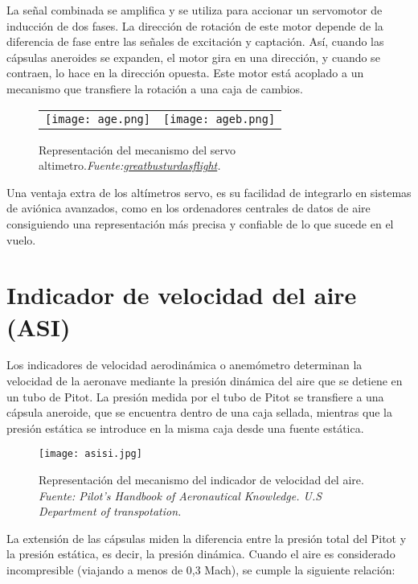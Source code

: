 La señal combinada se amplifica y se utiliza para accionar un servomotor de inducción de dos fases. La dirección de rotación de este motor depende de la diferencia de fase entre las señales de excitación y captación. Así, cuando las cápsulas aneroides se expanden, el motor gira en una dirección, y cuando se contraen, lo hace en la dirección opuesta. Este motor está acoplado a un mecanismo que transfiere la rotación a una caja de cambios.
\begin{figure}[H]
	\centering
	\begin{tabular}{c c}  
		\texttt{[image: age.png]} & 
		\texttt{[image: ageb.png]}\\
	\end{tabular}
	
    \caption{\centering Representación del mecanismo del servo altimetro.\textit{Fuente:\href{https://greatbustardsflight.blogspot.com/2015/01/el-altimetro-convencional-y-el-ciclo-de.html}{greatbusturdasflight}.}}
\label{fig:yepa}
\end{figure}

Una ventaja extra de los altímetros servo, es su facilidad de integrarlo en sistemas de aviónica avanzados, como en los ordenadores centrales de datos de aire consiguiendo una representación más precisa y confiable de lo que sucede en el vuelo.

\section{Indicador de velocidad del aire (ASI)}

Los indicadores de velocidad aerodinámica o anemómetro determinan la velocidad de la aeronave mediante la presión dinámica del aire que se detiene en un tubo de Pitot. La presión medida por el tubo de Pitot se transfiere a una cápsula aneroide, que se encuentra dentro de una caja sellada, mientras que la presión estática se introduce en la misma caja desde una fuente estática.
\begin{figure}[H] 
    \centering
    \texttt{[image: asisi.jpg]}
    \caption{\centering Representación del mecanismo del indicador de velocidad del aire. \textit{Fuente: Pilot's Handbook of Aeronautical Knowledge. U.S Department of transpotation.}}
    \label{fig:placeholder12}
\end{figure}

La extensión de las cápsulas miden la diferencia entre la presión total del Pitot y la presión estática, es decir, la presión dinámica. Cuando el aire es considerado incompresible (viajando a menos de 0,3 Mach), se cumple la siguiente relación: 

